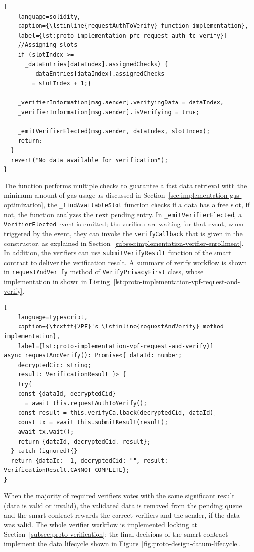 \begin{lstlisting}[
    language=solidity,
    caption={\lstinline{requestAuthToVerify} function implementation},
    label={lst:proto-implementation-pfc-request-auth-to-verify}]
    //Assigning slots
    if (slotIndex >=
      _dataEntries[dataIndex].assignedChecks) {
        _dataEntries[dataIndex].assignedChecks
        = slotIndex + 1;}

    _verifierInformation[msg.sender].verifyingData = dataIndex;
    _verifierInformation[msg.sender].isVerifying = true;

    _emitVerifierElected(msg.sender, dataIndex, slotIndex);
    return;
  }
  revert("No data available for verification");
}
\end{lstlisting}

The function performs multiple checks to guarantee a fast data retrieval with the minimum amount of gas usage as discussed in Section~\ref{sec:implementation-gas-optimization}, the \lstinline{_findAvailableSlot} function checks if a data has a free slot, if not, the function analyzes the next pending entry.
In \lstinline{_emitVerifierElected}, a \lstinline{VerifierElected} event is emitted; the verifiers are waiting for that event, when triggered by the event, they can invoke the \lstinline{verifyCallback} that is given in the constructor, as explained in Section~\ref{subsec:implementation-verifier-enrollment}.
In addition, the verifiers can use \lstinline{submitVerifyResult} function of the smart contract to deliver the verification result.
A summary of verify workflow is shown in \lstinline{requestAndVerify} method of \texttt{VerifyPrivacyFirst} class, whose implementation in shown in Listing~\ref{lst:proto-implementation-vpf-request-and-verify}.
\begin{lstlisting}[
    language=typescript,
    caption={\texttt{VPF}'s \lstinline{requestAndVerify} method implementation},
    label={lst:proto-implementation-vpf-request-and-verify}]
async requestAndVerify(): Promise<{ dataId: number;
    decryptedCid: string;
    result: VerificationResult }> {
    try{
    const {dataId, decryptedCid}
      = await this.requestAuthToVerify();
    const result = this.verifyCallback(decryptedCid, dataId);
    const tx = await this.submitResult(result);
    await tx.wait();
    return {dataId, decryptedCid, result};
  } catch (ignored){}
  return {dataId: -1, decryptedCid: "", result: VerificationResult.CANNOT_COMPLETE};
}
\end{lstlisting}

When the majority of required verifiers votes with the same significant result (data is valid or invalid), the validated data is removed from the pending queue and the smart contract rewards the correct verifiers and the sender, if the data was valid.
The whole verifier workflow is implemented looking at Section~\ref{subsec:proto-verification}; the final decisions of the smart contract implement the data lifecycle shown in Figure~\ref{fig:proto-design-datum-lifecycle}.


